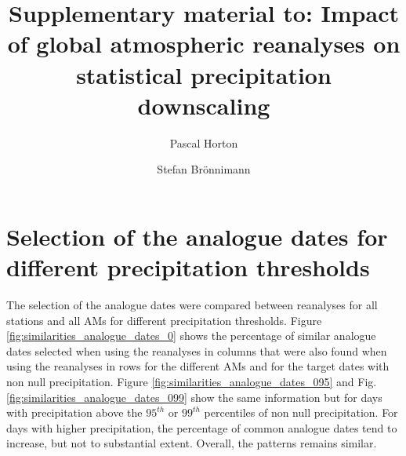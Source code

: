 \documentclass[twocolumn]{svjour3}       %
\date{}
\newcommand{\beginsupplement}{%
	\renewcommand{\thetable}{S\arabic{table}}%
	\renewcommand{\thefigure}{S\arabic{figure}}%
	\renewcommand{\thesection}{S\arabic{section}}%
}
\begin{document}
	
	\title{Supplementary material to: Impact of global atmospheric reanalyses on statistical precipitation downscaling
	}
	
	
	
	\author{Pascal Horton         \and
		Stefan Br\"{o}nnimann
	}


	
	
	
	\maketitle
	
	\beginsupplement
	

	\section{Selection of the analogue dates for different precipitation thresholds}
	\label{supp:analogue_days}
	
	The selection of the analogue dates were compared between reanalyses for all stations and all AMs for different precipitation thresholds. Figure \ref{fig:similarities_analogue_dates_0} shows the percentage of similar analogue dates selected when using the reanalyses in columns that were also found when using the reanalyses in rows for the different AMs and for the target dates with non null precipitation. Figure \ref{fig:similarities_analogue_dates_095} and Fig. \ref{fig:similarities_analogue_dates_099} show the same information but for days with precipitation above the $95^{th}$ or $99^{th}$ percentiles of non null precipitation. For days with higher precipitation, the percentage of common analogue dates tend to increase, but not to substantial extent. Overall, the patterns remains similar.	
	
\end{document}
